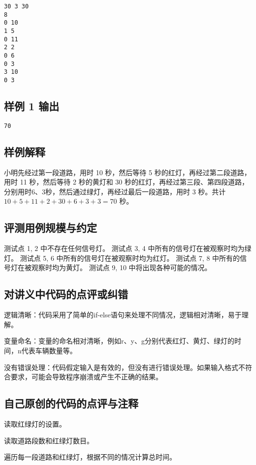 \begin{lstlisting}[numbers=none]
30 3 30
8
0 10
1 5
0 11
2 2
0 6
0 3
3 10
0 3
\end{lstlisting}

\subsection{样例 1 输出}

\begin{lstlisting}[numbers=none]
70
\end{lstlisting}

\subsection{样例解释}

小明先经过第一段道路，用时 10 秒，然后等待 5 秒的红灯，再经过第二段道路，用时 11 秒，然后等待 2 秒的黄灯和 30 秒的红灯，再经过第三段、第四段道路，分别用时6、3秒，然后通过绿灯，再经过最后一段道路，用时 3 秒。共计 $10 + 5 + 11 + 2 + 30 + 6 + 3 + 3=70$ 秒。

\subsection{评测用例规模与约定}

测试点 1, 2 中不存在任何信号灯。
测试点 3, 4 中所有的信号灯在被观察时均为绿灯。
测试点 5, 6 中所有的信号灯在被观察时均为红灯。
测试点 7, 8 中所有的信号灯在被观察时均为黄灯。
测试点 9, 10 中将出现各种可能的情况。

\subsection{对讲义中代码的点评或纠错}
逻辑清晰：代码采用了简单的if-else语句来处理不同情况，逻辑相对清晰，易于理解。

变量命名：变量的命名相对清晰，例如r、y、g分别代表红灯、黄灯、绿灯的时间，n代表车辆数量等。

没有错误处理：代码假定输入是有效的，但没有进行错误处理。如果输入格式不符合要求，可能会导致程序崩溃或产生不正确的结果。
\subsection{自己原创的代码的点评与注释}

读取红绿灯的设置。

读取道路段数和红绿灯数目。

遍历每一段道路和红绿灯，根据不同的情况计算总时间。

